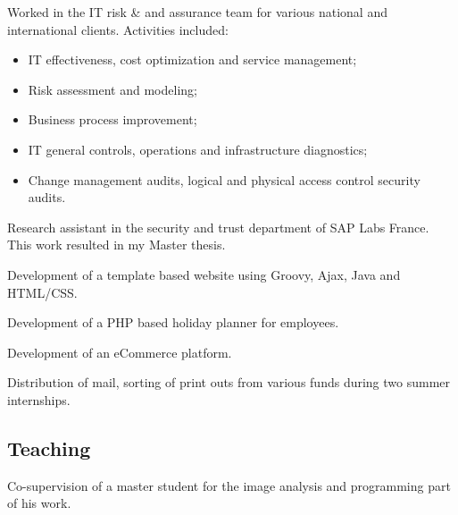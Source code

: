 \documentclass[11pt,a4paper,nolmodern, sans]{moderncv}        %
\begin{document}
{Worked in the IT risk \& and assurance team for various national and international clients. \newline{} Activities included:
\begin{itemize}
	\item IT effectiveness, cost optimization and service management;
	\item Risk assessment and modeling;
	\item Business process improvement;
	\item IT general controls, operations and infrastructure diagnostics;
	\item Change management audits, logical and physical access control security audits.
\end{itemize}}


{Research assistant in the security and trust department of SAP Labs France. This work resulted in my Master thesis.}

{Development of a template based website using Groovy, Ajax, Java and HTML/CSS.}{}

{Development of a PHP based holiday planner for employees.}

{Development of an eCommerce platform.}

{Distribution of mail, sorting of print outs from various funds during two summer internships.}


\subsection{Teaching}

{Co-supervision of a master student for the image analysis and programming part of his work.
}
\end{document}
